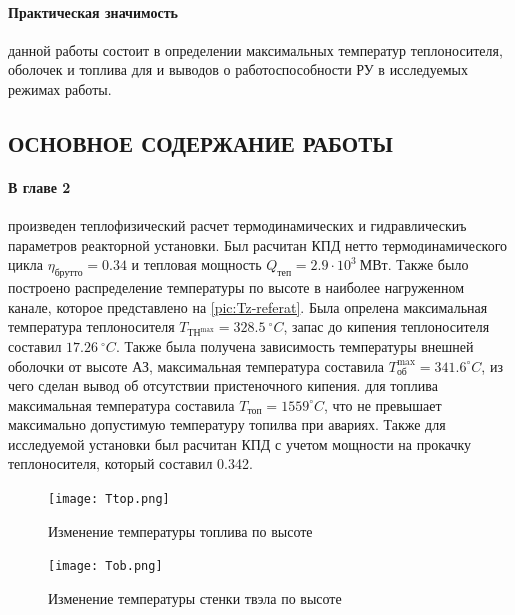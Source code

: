 \paragraph*{Практическая значимость} данной работы состоит в определении максимальных температур теплоносителя, оболочек и топлива для и выводов о работоспособности РУ в исследуемых режимах работы.
\subsection*{ОСНОВНОЕ СОДЕРЖАНИЕ РАБОТЫ}
\paragraph*{В главе 2} произведен теплофизический расчет термодинамических и гидравлическиъ параметров реакторной установки. Был расчитан КПД нетто термодинамического цикла $\eta_{\text{брутто}}=0.34$ и тепловая мощность $Q_{\text{теп}}=2.9 \cdot 10^3\ \text{МВт}$. Также было построено распределение температуры по высоте в наиболее нагруженном канале, которое представлено на \ref{pic:Tz-referat}. Была опрелена максимальная температура теплоносителя $T_{\text{ТН}^{\text{max}}} = 328.5\ ^\circ C$, запас до кипения теплоносителя составил $ 17.26\ ^\circ C$. Также была получена зависимость температуры внешней оболочки от высоте АЗ, максимальная температура составила $T_{\text{об}}^{\max} = 341.6 ^\circ C $, из чего сделан вывод об отсутствии пристеночного кипения. для  топлива максимальная температура составила $T_{\text{топ}} = 1559 ^\circ C$, что не превышает максимально допустимую температуру топилва при авариях. Также для исследуемой установки был расчитан КПД с учетом мощности на прокачку теплоносителя, который составил 0.342.
\begin{figure}[H]
	\begin{center}
		\texttt{[image: Ttop.png]}
		\caption{Изменение температуры топлива по высоте}
		\label{pic:top-referat} %
	\end{center}
\end{figure}

\begin{figure}[H]
	\begin{center}
		\texttt{[image: Tob.png]}
		\caption{Изменение температуры стенки твэла по высоте}
		\label{pic:Tob-referat} %
	\end{center}
\end{figure}

